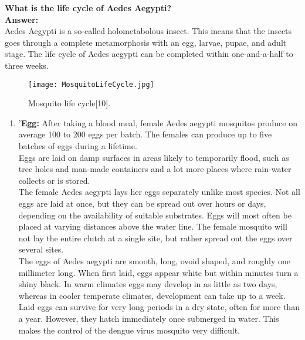 \documentclass[11pt]{exam}
\begin{document}
\begin{questions}
\newpage
\question
\label{6. Life cycle of Ae.aegypti}
\textbf{What is the life cycle of Aedes Aegypti?}\\
\textbf{Answer:} \\
Aedes Aegypti is a so-called holometabolous insect. This means that the insects goes through a complete metamorphosis with an egg, larvae, pupae, and adult stage. The life cycle of Aedes aegypti can be completed within one-and-a-half to three weeks. \\
\begin{figure}[H]
  \centering
  \texttt{[image: MosquitoLifeCycle.jpg]}\label{fig:f1}
  \caption{Mosquito life cycle[10].}
\end{figure} 
\begin{enumerate}
\item '\textbf{Egg:} After taking a blood meal, female Aedes aegypti mosquitos produce on average 100 to 200 eggs per batch. The females can produce up to five batches of eggs during a lifetime. \\ %
Eggs are laid on damp surfaces in areas likely to temporarily flood, such as tree holes and man-made containers and a lot more places where rain-water collects or is stored.\\%
The female Aedes aegypti lays her eggs separately unlike most species. Not all eggs are laid at once, but they can be spread out over hours or days, depending on the availability of suitable substrates. Eggs will most often be placed at varying distances above the water line. The female mosquito will not lay the entire clutch at a single site, but rather spread out the eggs over several sites.\\
The eggs of Aedes aegypti are smooth, long, ovoid shaped, and roughly one millimeter long. When first laid, eggs appear white but within minutes turn a shiny black. In warm climates eggs may develop in as little as two days, whereas in cooler temperate climates, development can take up to a week. Laid eggs can survive for very long periods in a dry state, often for more than a year. However, they hatch immediately once submerged in water. This makes the control of the dengue virus mosquito very difficult.\\ 


\end{enumerate}
\end{questions}
\end{document}
